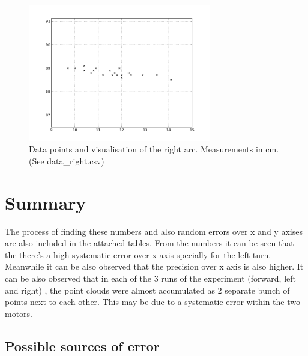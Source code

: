 \documentclass{scrartcl}
\begin{document}
\begin{figure}[h]
\centering
\begin{minipage}{.5\textwidth}
  \centering
\end{minipage}%
\begin{minipage}{.5\textwidth}
  \centering
   \includegraphics[width= 8cm]{img/data_right.png}  
\end{minipage}
\caption{Data points and visualisation of the right arc. Measurements in cm. (See data\_right.csv)}
\label{fig:data_left}
\end{figure}
 
\section{Summary}
The process of finding these numbers and also random errors over x and y axises are also included in the attached tables. 
From the numbers it can be seen that the there's a high systematic error over x axis specially for the left turn. Meanwhile it can be also observed that the precision over x axis is also higher. 
It can be also observed that in each of the 3 runs of the experiment (forward, left and right) , the point clouds were almost accumulated as 2 separate bunch of points next to each other. This may be due to a systematic error within the two motors.

\subsection{Possible sources of error}
\end{document}
